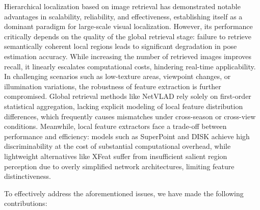 \documentclass[journal]{IEEEtran}
\begin{document}
Hierarchical localization based on image retrieval has demonstrated notable advantages in scalability, reliability, and effectiveness, establishing itself as a dominant paradigm for large-scale visual localization\cite{ref6}. However, its performance critically depends on the quality of the global retrieval stage: failure to retrieve semantically coherent local regions leads to significant degradation in pose estimation accuracy. While increasing the number of retrieved images improves recall, it linearly escalates computational costs, hindering real-time applicability. In challenging scenarios such as low-texture areas, viewpoint changes, or illumination variations, the robustness of feature extraction is further compromised. Global retrieval methods like NetVLAD\cite{ref7} rely solely on first-order statistical aggregation, lacking explicit modeling of local feature distribution differences, which frequently causes mismatches under cross-season or cross-view conditions. Meanwhile, local feature extractors face a trade-off between performance and efficiency: models such as SuperPoint\cite{ref8} and DISK\cite{ref9} achieve high discriminability at the cost of substantial computational overhead, while lightweight alternatives like XFeat\cite{ref11} suffer from insufficient salient region perception due to overly simplified network architectures, limiting feature distinctiveness. 


To effectively address the aforementioned issues, we have made the following contributions:
\end{document}
